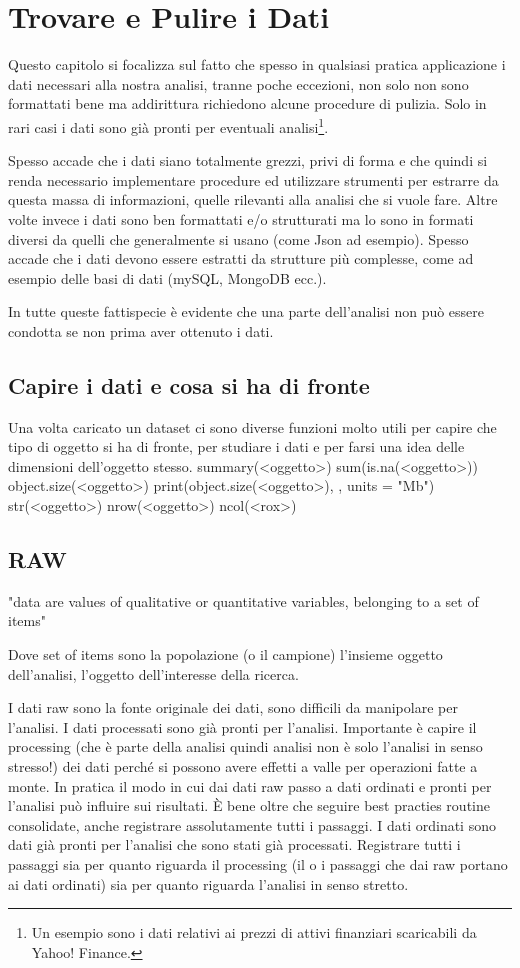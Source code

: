\chapter{Trovare e Pulire i Dati}
Questo capitolo si focalizza sul fatto che spesso in qualsiasi pratica applicazione i dati necessari alla nostra analisi, tranne poche eccezioni, non solo non sono formattati bene ma addirittura richiedono alcune procedure di pulizia. Solo in rari casi i dati sono già pronti per eventuali analisi\footnote{Un esempio sono i dati relativi ai prezzi di attivi finanziari scaricabili da Yahoo! Finance.}.

Spesso accade che i dati siano totalmente grezzi, privi di forma e che quindi si renda necessario implementare procedure ed utilizzare strumenti per estrarre da questa massa  di informazioni, quelle rilevanti alla analisi che si vuole fare. Altre volte invece i dati sono ben formattati e/o strutturati ma lo sono in formati
diversi da quelli che generalmente si usano (come Json ad esempio). Spesso accade che i dati devono essere estratti da strutture più complesse, come ad esempio delle basi di dati (mySQL, MongoDB ecc.).

In tutte queste fattispecie è evidente che una parte dell'analisi non può essere condotta se non prima aver ottenuto i dati.


\section{Capire i dati e cosa si ha di fronte}
Una volta caricato un dataset ci sono diverse funzioni molto utili per capire che tipo di oggetto si ha di fronte, per studiare i dati e per farsi una idea delle dimensioni dell'oggetto stesso.
summary(<oggetto>)
sum(is.na(<oggetto>))
object.size(<oggetto>)
print(object.size(<oggetto>), , units = "Mb")
str(<oggetto>)
nrow(<oggetto>)
ncol(<rox>)
\section{RAW}

"data are values of qualitative or quantitative variables, belonging to a set of items"

Dove set of items sono la popolazione (o il campione) l'insieme oggetto dell'analisi, l'oggetto dell'interesse della ricerca.


I dati raw sono la fonte originale dei dati, sono difficili da manipolare per 
l'analisi.
I dati processati sono già pronti per l'analisi.
Importante è capire il processing (che è parte della analisi quindi analisi non è solo l'analisi in senso stresso!) dei dati perché si possono avere effetti a valle per operazioni fatte a monte. In pratica il modo in cui dai dati raw passo a dati ordinati 
e pronti per l'analisi può influire sui risultati.
È bene oltre che seguire best practies routine consolidate, anche registrare assolutamente
tutti i passaggi.
I dati ordinati sono dati già pronti per l'analisi che sono stati già processati.
Registrare tutti i passaggi sia per quanto riguarda il processing (il o i passaggi che dai raw portano ai dati ordinati) sia per quanto riguarda l'analisi in senso stretto.

